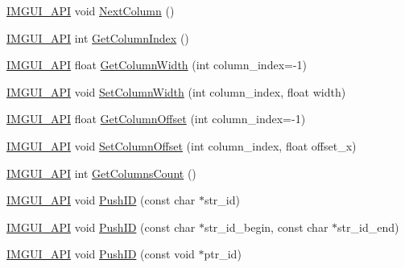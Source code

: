 \begin{DoxyCompactItemize}
\item 
\mbox{\hyperlink{imgui_8h_a43829975e84e45d1149597467a14bbf5}{I\+M\+G\+U\+I\+\_\+\+A\+PI}} void \mbox{\hyperlink{namespace_im_gui_a8f97746d6a9d59c8400c26fb7613a2ff}{Next\+Column}} ()
\item 
\mbox{\hyperlink{imgui_8h_a43829975e84e45d1149597467a14bbf5}{I\+M\+G\+U\+I\+\_\+\+A\+PI}} int \mbox{\hyperlink{namespace_im_gui_acc31f8eea4fcfb86edeb3ac12d82fc05}{Get\+Column\+Index}} ()
\item 
\mbox{\hyperlink{imgui_8h_a43829975e84e45d1149597467a14bbf5}{I\+M\+G\+U\+I\+\_\+\+A\+PI}} float \mbox{\hyperlink{namespace_im_gui_a3d205d86dab5ca0763a92997283ac36e}{Get\+Column\+Width}} (int column\+\_\+index=-\/1)
\item 
\mbox{\hyperlink{imgui_8h_a43829975e84e45d1149597467a14bbf5}{I\+M\+G\+U\+I\+\_\+\+A\+PI}} void \mbox{\hyperlink{namespace_im_gui_af17222ec47aebb5ede00be7b52de9f5d}{Set\+Column\+Width}} (int column\+\_\+index, float width)
\item 
\mbox{\hyperlink{imgui_8h_a43829975e84e45d1149597467a14bbf5}{I\+M\+G\+U\+I\+\_\+\+A\+PI}} float \mbox{\hyperlink{namespace_im_gui_a79c22e9c5c208b6c9534a273be71a9e6}{Get\+Column\+Offset}} (int column\+\_\+index=-\/1)
\item 
\mbox{\hyperlink{imgui_8h_a43829975e84e45d1149597467a14bbf5}{I\+M\+G\+U\+I\+\_\+\+A\+PI}} void \mbox{\hyperlink{namespace_im_gui_a8cc207211d6cf3f77b505e24aed4ebcc}{Set\+Column\+Offset}} (int column\+\_\+index, float offset\+\_\+x)
\item 
\mbox{\hyperlink{imgui_8h_a43829975e84e45d1149597467a14bbf5}{I\+M\+G\+U\+I\+\_\+\+A\+PI}} int \mbox{\hyperlink{namespace_im_gui_a3c2998ad9527948a4e4166c4f7db9ec9}{Get\+Columns\+Count}} ()
\item 
\mbox{\hyperlink{imgui_8h_a43829975e84e45d1149597467a14bbf5}{I\+M\+G\+U\+I\+\_\+\+A\+PI}} void \mbox{\hyperlink{namespace_im_gui_a27a8533605dc5b8cabf161bf7715bbde}{Push\+ID}} (const char $\ast$str\+\_\+id)
\item 
\mbox{\hyperlink{imgui_8h_a43829975e84e45d1149597467a14bbf5}{I\+M\+G\+U\+I\+\_\+\+A\+PI}} void \mbox{\hyperlink{namespace_im_gui_af5e55788830807a7c53d5dd7865b692a}{Push\+ID}} (const char $\ast$str\+\_\+id\+\_\+begin, const char $\ast$str\+\_\+id\+\_\+end)
\item 
\mbox{\hyperlink{imgui_8h_a43829975e84e45d1149597467a14bbf5}{I\+M\+G\+U\+I\+\_\+\+A\+PI}} void \mbox{\hyperlink{namespace_im_gui_af9cf42fdf2fbc5eeec7521de14996bfb}{Push\+ID}} (const void $\ast$ptr\+\_\+id)
\item 

\end{DoxyCompactItemize}
